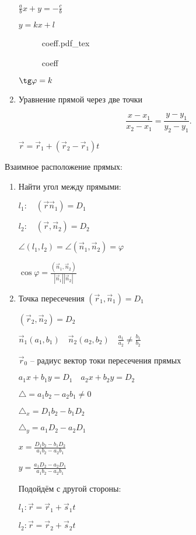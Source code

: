 \documentclass{book}
\theoremstyle{definition}
\newcommand{\incfig}[1]{%
    \def\svgwidth{\columnwidth}
    {#1.pdf_tex}
}
\begin{document}
\begin{enumerate}
    $\frac{a}{b}x + y = -\frac{c}{b}$ 

    $y = kx+l$

\begin{figure}[ht]
    \centering
    \incfig{coeff}
    \caption{coeff}
    \label{fig:coeff}
\end{figure}
$\tg \varphi = k$
\item Уравнение прямой через две точки

     \[
     \frac{x-x_1}{x_2-x_1} = \frac{y-y_1}{y_2-y_1}
     .\] 

     $\vec r = \vec r_1 + (\vec r_2-\vec r_1)t$
\end{enumerate}

Взаимное расположение прямых:
\begin{enumerate}
    \item Найти угол между прямыми:

        $l_1:\quad (\vec r\vec n_1) = D_1$

        $l_2:\quad (\vec r, \vec n_2) = D_2$

        $\angle \left( l_1, l_2 \right)  = \angle\left( \vec n_1, \vec n_2 \right)  = \varphi$

        $\cos\varphi = \frac{(\vec n_1, \vec n_2)}{\left| \vec n_1 \right| \left| \vec n_2 \right| }$

    \item Точка пересечения
        $\left( \vec r_1, \vec n_1 \right)  = D_1$
        
        $\left( \vec r_2, \vec n_2 \right)  = D_2$

        $\vec n_1(a_1, b_1)\quad \vec n_2\left( a_2, b_2 \right) \quad \frac{a_1}{a_2}\neq \frac{b_1}{b_2}$ 

        $\vec r_0$ -- радиус вектор токи пересечения прямых

        $a_1x+b_1y=D_1\quad a_2x+b_2y = D_2$

        $\triangle = a_1b_2-a_2b_1\neq 0$

        $\triangle_x = D_1b_2-b_1D_2$

        $\triangle_y = a_1D_2-a_2D_1$

        $x = \frac{D_1b_2-b_1D_2}{a_1b_2-a_2b_1}$ 

        $y = \frac{a_1D_2-a_2D_1}{a_1b_2-a_2b_1}$ 

        Подойдём с другой стороны:

        $l_1: \vec r = \vec r_1 + \vec s_1 t$

        $l_2: \vec r = \vec r_2 + \vec s_2 t$


\end{enumerate}
\end{document}
